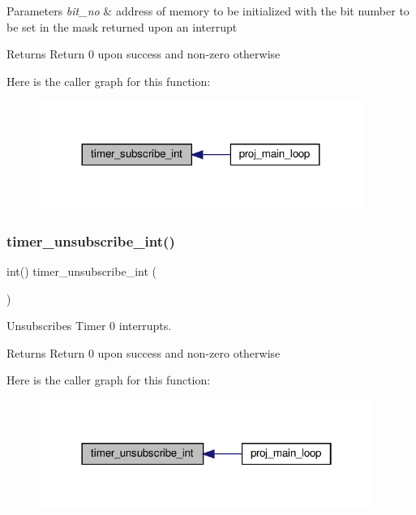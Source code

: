 \begin{DoxyParams}{Parameters}
{\em bit\+\_\+no} & address of memory to be initialized with the bit number to be set in the mask returned upon an interrupt \\
\hline
\end{DoxyParams}
\begin{DoxyReturn}{Returns}
Return 0 upon success and non-\/zero otherwise 
\end{DoxyReturn}
Here is the caller graph for this function\+:
\nopagebreak
\begin{figure}[H]
\begin{center}
\leavevmode
\includegraphics[width=299pt]{group__timer_gac57a7e1140a7e00ad95ac5488d2a671b_icgraph}
\end{center}
\end{figure}
\mbox{\label{group__timer_gafabd21de449be154dd65d5fdb2d8045d}} 
\subsubsection{\texorpdfstring{timer\+\_\+unsubscribe\+\_\+int()}{timer\_unsubscribe\_int()}}
{\footnotesize\ttfamily int() timer\+\_\+unsubscribe\+\_\+int (\begin{DoxyParamCaption}{ }\end{DoxyParamCaption})}



Unsubscribes Timer 0 interrupts. 

\begin{DoxyReturn}{Returns}
Return 0 upon success and non-\/zero otherwise 
\end{DoxyReturn}
Here is the caller graph for this function\+:
\nopagebreak
\begin{figure}[H]
\begin{center}
\leavevmode
\includegraphics[width=310pt]{group__timer_gafabd21de449be154dd65d5fdb2d8045d_icgraph}
\end{center}
\end{figure}


